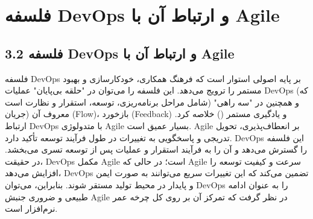 \section{فلسفه DevOps و ارتباط آن با Agile}

\subsection*{3.2 فلسفه DevOps و ارتباط آن با Agile}
فلسفه DevOps بر پایه اصولی استوار است که فرهنگ همکاری، خودکارسازی و بهبود مستمر را ترویج می‌دهد. این فلسفه را می‌توان در "حلقه بی‌پایان" عملیات DevOps (که شامل مراحل برنامه‌ریزی، توسعه، استقرار و نظارت است) و همچنین در "سه راهی" معروف آن (جریان (Flow)، بازخورد (Feedback) و یادگیری مستمر () خلاصه کرد.
ارتباط DevOps با متدولوژی Agile بسیار عمیق است. Agile بر انعطاف‌پذیری، تحویل تدریجی و پاسخگویی به تغییرات در طول فرآیند توسعه تأکید دارد. DevOps این فلسفه را گسترش می‌دهد و آن را به فرآیند استقرار و عملیات پس از توسعه تسری می‌بخشد. در حقیقت، DevOps مکمل Agile است؛ در حالی که Agile سرعت و کیفیت توسعه را افزایش می‌دهد، DevOps تضمین می‌کند که این تغییرات سریع می‌توانند به صورت ایمن و پایدار در محیط تولید مستقر شوند. بنابراین، می‌توان DevOps را به عنوان ادامه طبیعی و ضروری جنبش Agile در نظر گرفت که تمرکز آن بر روی کل چرخه عمر نرم‌افزار است.

